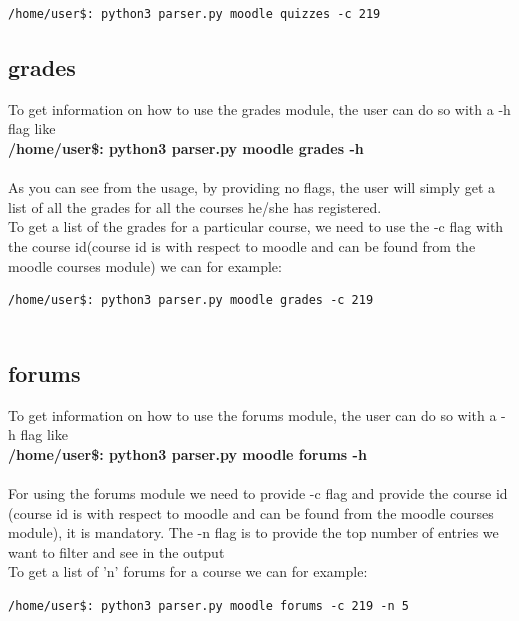 \documentclass[12pt, letterpaper, twoside]{article}
\begin{document}
\begin{verbatim}
/home/user$: python3 parser.py moodle quizzes -c 219

\end{verbatim}

\subsection{grades}
To get information on how to use the grades module, the user can do so with a -h flag like \\
\textbf{/home/user\$: python3 parser.py moodle grades -h}\\
\\
As you can see from the usage, by providing no flags, the user will simply get a list of all the grades for all the courses he/she has registered.\\
To get a list of the grades for a particular course, we need to use the -c flag with the course id(course id is with respect to moodle and can be found from the moodle courses module) we can for example:

\begin{verbatim}
/home/user$: python3 parser.py moodle grades -c 219
    
\end{verbatim}

\subsection{forums}
To get information on how to use the forums module, the user can do so with a -h flag like \\
\textbf{/home/user\$: python3 parser.py moodle forums -h}\\
\\
For using the forums module we need to provide -c flag and provide the course id (course id is with respect to moodle and can be found from the moodle courses module), it is mandatory. The -n flag is to provide the top number of entries we want to filter and see in the output\\
To get a list of 'n' forums for a course we can for example:

\begin{verbatim}
/home/user$: python3 parser.py moodle forums -c 219 -n 5
    
\end{verbatim}
\end{document}
